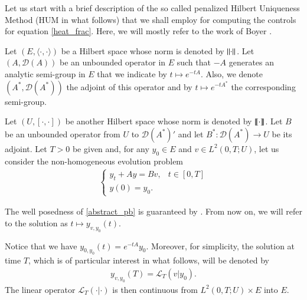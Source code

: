 %	
%


Let us start with a brief description of the so called penalized Hilbert Uniqueness Method (HUM in what follows) that we shall employ for computing the controls for equation \eqref{heat_frac}. Here, we will mostly refer to the work of Boyer \cite{boyer2013penalised}.

Let $(E,\langle\cdot,\cdot\rangle)$ be a Hilbert space whose norm is denoted by ${\left\|\cdot\right\|}_{}$. Let $(A,\mathcal D(A))$ be an unbounded operator in $E$ such that $-A$ generates an analytic semi-group in $E$ that we indicate by $t\mapsto e^{-tA}$. Also, we denote $(A^*,\mathcal D(A^*))$ the adjoint of this operator and by $t\mapsto e^{-tA^*}$ the corresponding semi-group. 

Let $(U,[\cdot,\cdot])$ be another Hilbert space whose norm is denoted by $\llbracket \cdot\rrbracket$. Let  $B$ be an unbounded operator from $U$ to $\mathcal D(A^*)'$ and let $B^*:\mathcal D(A^*)\to U$ be its adjoint. Let $T>0$ be given and, for any $y_0\in E$ and $v\in L^2(0,T;U)$, let us consider the non-homogeneous evolution problem  
\begin{align}\label{abstract_pb}
	\begin{cases}
		y_t+Ay=Bv, & t\in[0,T]
		\\
		y(0)=y_0.
	\end{cases}
\end{align}

The well posedness of \eqref{abstract_pb} is guaranteed by \cite[Theorem 2.37]{coron2007control}. From now on, we will refer to the solution as $t\mapsto y_{v,y_0}(t)$.

Notice that we have $y_{0,y_0}(t)= e^{-tA}y_0$. Moreover, for simplicity, the solution at time $T$, which is of particular interest in what follows, will be denoted by 
\begin{align*}
	y_{v,y_0}(T)=\mathcal{L}_T(v|y_0).
\end{align*} 
The linear operator $\mathcal{L}_T(\cdot|\cdot)$ is then continuous from $L^2(0,T;U)\times E$ into $E$.

